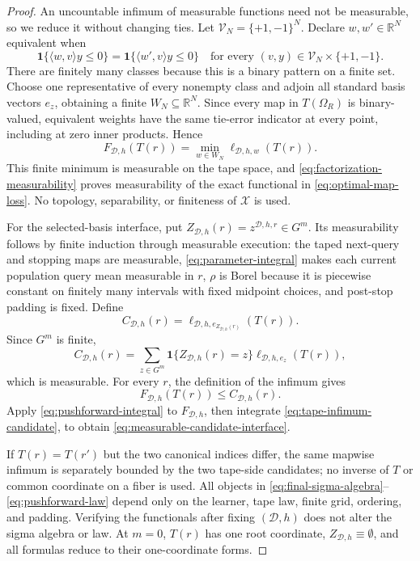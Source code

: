 \begin{proof}
An uncountable infimum of measurable functions need not be measurable, so
we reduce it without changing ties.  Let
\(\mathcal V_N=\{+1,-1\}^N\).  Declare \(w,w'\in\mathbb R^N\) equivalent
when
\[
\mathbf 1\{\langle w,v\rangle y\le0\}
=\mathbf 1\{\langle w',v\rangle y\le0\}
\quad\text{for every }(v,y)\in\mathcal V_N\times\{+1,-1\}.
\tag{A.21}\label{eq:tie-pattern-equivalence}
\]
There are finitely many classes because this is a binary pattern on a finite
set.  Choose one representative of every nonempty class and adjoin all
standard basis vectors \(e_z\), obtaining a finite
\(W_N\subseteq\mathbb R^N\).  Since every map in \(T(\Omega_R)\) is
binary-valued, equivalent weights have the same tie-error indicator at every
point, including at zero inner products.  Hence
\[
F_{\mathcal D,h}(T(r))
=\min_{w\in W_N}\ell_{\mathcal D,h,w}(T(r)).
\tag{A.22}\label{eq:finite-pattern-minimum}
\]
This finite minimum is measurable on the tape space, and
\eqref{eq:factorization-measurability} proves measurability of the exact
functional in \eqref{eq:optimal-map-loss}.  No topology, separability, or
finiteness of \(\mathcal X\) is used.

For the selected-basis interface, put
\(Z_{\mathcal D,h}(r)=z^{\mathcal D,h,r}\in G^m\).  Its measurability
follows by finite induction through measurable execution: the taped
next-query and stopping maps are measurable,
\eqref{eq:parameter-integral} makes each current population query mean
measurable in \(r\), \(\rho\) is Borel because it is piecewise constant on
finitely many intervals with fixed midpoint choices, and post-stop padding
is fixed.  Define
\[
C_{\mathcal D,h}(r)
=\ell_{\mathcal D,h,e_{Z_{\mathcal D,h}(r)}}(T(r)).
\]
Since \(G^m\) is finite,
\[
C_{\mathcal D,h}(r)
=\sum_{z\in G^m}
\mathbf 1\{Z_{\mathcal D,h}(r)=z\}
\ell_{\mathcal D,h,e_z}(T(r)),
\tag{A.23}\label{eq:selected-basis-finite-sum}
\]
which is measurable.  For every \(r\), the definition of the infimum gives
\[
F_{\mathcal D,h}(T(r))\le C_{\mathcal D,h}(r).
\tag{A.24}\label{eq:tape-infimum-candidate}
\]
Apply \eqref{eq:pushforward-integral} to \(F_{\mathcal D,h}\), then
integrate \eqref{eq:tape-infimum-candidate}, to obtain
\eqref{eq:measurable-candidate-interface}.

If \(T(r)=T(r')\) but the two canonical indices differ, the same mapwise
infimum is separately bounded by the two tape-side candidates; no inverse of
\(T\) or common coordinate on a fiber is used.  All objects in
\eqref{eq:final-sigma-algebra}--\eqref{eq:pushforward-law} depend only on the
learner, tape law, finite grid, ordering, and padding.  Verifying the
functionals after fixing \((\mathcal D,h)\) does not alter the sigma algebra
or law.  At \(m=0\), \(T(r)\) has one root coordinate,
\(Z_{\mathcal D,h}\equiv\emptyset\), and all formulas reduce to their
one-coordinate forms.
\end{proof}

